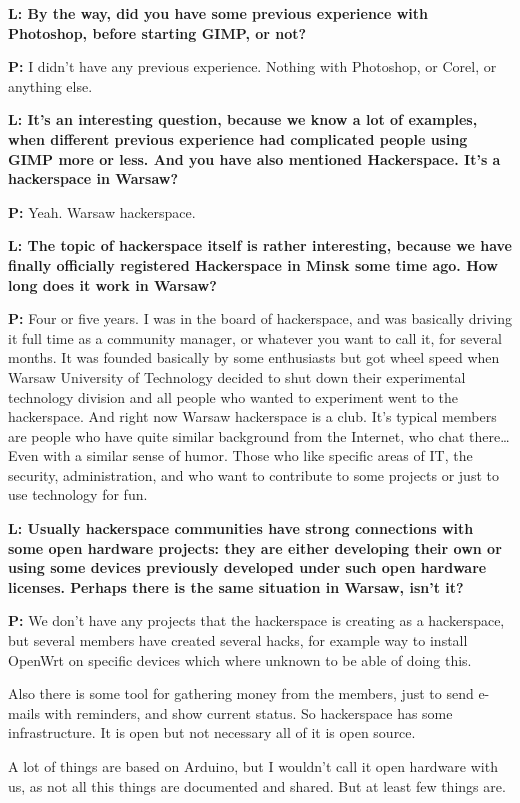 \documentclass[10pt, a5paper]{article}
\begin{document}
\begin{Parallel}[p]{}{}
{{\noindent \bf L: By the way, did you have some previous experience with Photoshop, before starting GIMP, or not?}

{\noindent \bf P:}  I didn't have any previous experience. Nothing with Photoshop, or Corel, or anything else.

{\noindent \bf L: It's an interesting question, because we know a lot of examples, when different previous experience had complicated people using GIMP more or less. And you have also mentioned Hackerspace. It’s a hackerspace in Warsaw?}

{\noindent \bf P:} Yeah. Warsaw hackerspace. 

{\noindent \bf L: The topic of hackerspace itself is rather interesting, because we have finally officially registered Hackerspace in Minsk some time ago. How long does it work in Warsaw?}

{\noindent \bf P:} Four or five years. I was in the board of hackerspace, and was basically driving it full time as a community manager, or whatever you want to call it, for several months. It was founded basically by some enthusiasts but got wheel speed when Warsaw University of Technology decided to shut down their experimental technology division and all people who wanted to experiment went to the hackerspace. And right now Warsaw hackerspace is a club. It’s typical members are people who have quite similar background from the Internet, who chat there… Even with a similar sense of humor. Those who like specific areas of IT, the security, administration, and who want to contribute to some projects or just to use technology for fun.

{\noindent \bf L: Usually hackerspace communities have strong connections with some open hardware projects: they are either developing their own or using some devices previously developed under such open hardware licenses. Perhaps there is the same situation in Warsaw, isn’t it?}

{\noindent \bf P:} We don’t have any projects that the hackerspace is creating as a hackerspace, but several members have created several hacks, for example way to install OpenWrt on specific devices which where unknown to be able of doing this.

Also there is some tool for gathering money from the members, just to send e-mails with reminders, and show current status. So hackerspace has some infrastructure. It is open but not necessary all of it is open source. 
 
A lot of things are based on Arduino, but I wouldn’t call it open hardware with us, as not all this things are documented and shared. But at least few things are.

}
\end{Parallel}
\end{document}

